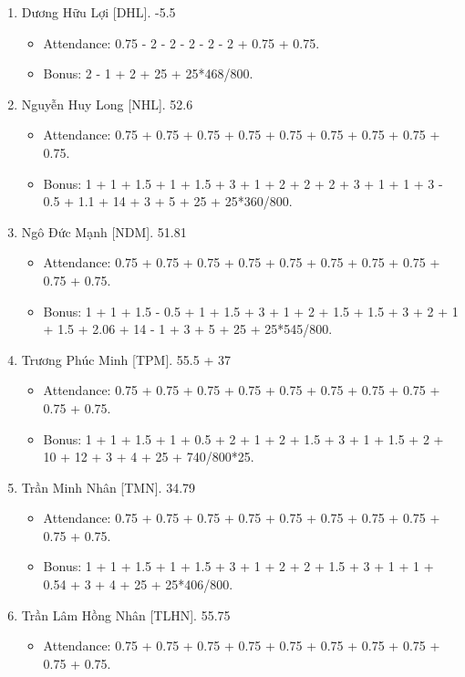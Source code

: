 \documentclass{article}
\begin{document}
\begin{enumerate}
\begin{itemize}
    \end{itemize}
    \item {\sc Dương Hữu Lợi [DHL].} -5.5
    \begin{itemize}
        \item Attendance: 0.75 - 2 - 2 - 2 - 2 - 2 + 0.75 + 0.75.
        \item Bonus: 2 - 1 + 2 + 25 + 25*468/800.
    \end{itemize}
    \item {\sc Nguyễn Huy Long [NHL].} 52.6
    \begin{itemize}
        \item Attendance: 0.75 + 0.75 + 0.75 + 0.75 + 0.75 + 0.75 + 0.75 + 0.75 + 0.75.
        \item Bonus: 1 + 1 + 1.5 + 1 + 1.5 + 3 + 1 + 2 + 2 + 2 + 3 + 1 + 1 + 3 - 0.5 + 1.1 + 14 + 3 + 5 + 25 + 25*360/800.
    \end{itemize}
    \item {\sc Ngô Đức Mạnh [NDM].} 51.81
    \begin{itemize}
        \item Attendance: 0.75 + 0.75 + 0.75 + 0.75 + 0.75 + 0.75 + 0.75 + 0.75 + 0.75 + 0.75.
        \item Bonus: 1 + 1 + 1.5 - 0.5 + 1 + 1.5 + 3 + 1 + 2 + 1.5 + 1.5 + 3 + 2 + 1 + 1.5 + 2.06 + 14 - 1 + 3 + 5 + 25 + 25*545/800.
    \end{itemize}
    \item {\sc Trương Phúc Minh [TPM].} 55.5 + 37
    \begin{itemize}
        \item Attendance: 0.75 + 0.75 + 0.75 + 0.75 + 0.75 + 0.75 + 0.75 + 0.75 + 0.75 + 0.75.
        \item Bonus: 1 + 1 + 1.5 + 1 + 0.5 + 2 + 1 + 2 + 1.5 + 3 + 1 + 1.5 + 2 + 10 + 12 + 3 + 4 + 25 + 740/800*25.
    \end{itemize}
    \item {\sc Trần Minh Nhân [TMN].} 34.79
    \begin{itemize}
        \item Attendance: 0.75 + 0.75 + 0.75 + 0.75 + 0.75 + 0.75 + 0.75 + 0.75 + 0.75 + 0.75.
        \item Bonus: 1 + 1 + 1.5 + 1 + 1.5 + 3 + 1 + 2 + 2 + 1.5 + 3 + 1 + 1 + 0.54 + 3 + 4 + 25 + 25*406/800.
    \end{itemize}
    \item {\sc Trần Lâm Hồng Nhân [TLHN].} 55.75
    \begin{itemize}
        \item Attendance: 0.75 + 0.75 + 0.75 + 0.75 + 0.75 + 0.75 + 0.75 + 0.75 + 0.75 + 0.75.

\end{itemize}
\end{enumerate}
\end{document}
